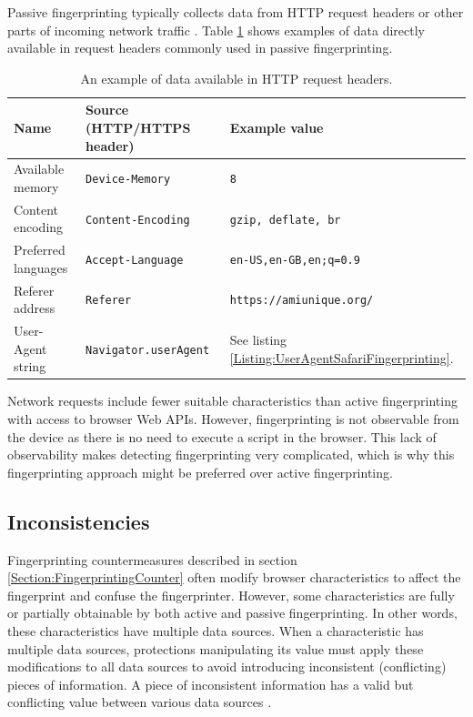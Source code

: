 Passive fingerprinting typically collects data from HTTP request headers or other parts of incoming network traffic \cite{JShelterPaper}. Table \ref{Table:PassiveDataExamples} shows examples of data directly available in request headers commonly used in passive fingerprinting.

\begin{table}[H]
	\centering
	\begin{tabular}{lll}
		\toprule
		Name                & Source (HTTP/HTTPS header)   & Example value \\
		\midrule
		Available memory    & \texttt{Device-Memory}       & \verb|8| \\
		Content encoding    & \texttt{Content-Encoding}    & \verb|gzip, deflate, br| \\
		Preferred languages & \texttt{Accept-Language}     & \verb|en-US,en-GB,en;q=0.9| \\
		Referer address     & \texttt{Referer}             & \verb|https://amiunique.org/| \\
		User-Agent string   & \texttt{Navigator.userAgent} & See listing \ref{Listing:UserAgentSafariFingerprinting}. \\
		\bottomrule                               
	\end{tabular}
	
	\caption{An example of data available in HTTP request headers.}
	\label{Table:PassiveDataExamples}
\end{table}

Network requests include fewer suitable characteristics than active fingerprinting with access to browser Web APIs. However, fingerprinting is not observable from the device as there is no need to execute a script in the browser. This lack of observability makes detecting fingerprinting very complicated, which is why this fingerprinting approach might be preferred over active fingerprinting.

\subsection{Inconsistencies}

Fingerprinting countermeasures described in section \ref{Section:FingerprintingCounter} often modify browser characteristics to affect the fingerprint and confuse the fingerprinter. However, some characteristics are fully or partially obtainable by both active and passive fingerprinting. In other words, these characteristics have multiple data sources. When a characteristic has multiple data sources, protections manipulating its value must apply these modifications to all data sources to avoid introducing inconsistent (conflicting) pieces of information. A piece of inconsistent information has a valid but conflicting value between various data sources \cite{VondracekDP}.

